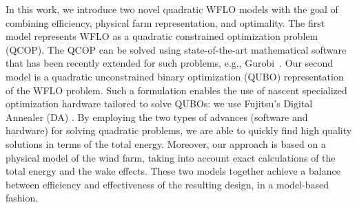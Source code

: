 \documentclass[preprint,12pt]{elsarticle}
\begin{document}

In this work, we introduce two novel quadratic WFLO models with the goal 
of combining efficiency, physical farm representation, and optimality. The first
model represents WFLO as a quadratic constrained optimization
problem (QCOP).  The QCOP can be solved using state-of-the-art mathematical software
that has been recently extended for such problems, e.g., Gurobi~\cite{gurobi}.  Our
second model is a quadratic unconstrained binary optimization
(QUBO) representation of the WFLO problem.  Such a formulation enables the use of
nascent specialized optimization hardware tailored to solve QUBOs: we use Fujitsu's Digital Annealer (DA) \cite{aramon2019physics}. By employing the two types of advances (software and hardware) for solving
quadratic problems, 
we are able to quickly find high quality solutions in terms of the total energy. Moreover, our approach is based
on a physical model of the wind farm, taking into account
exact calculations of the total energy and the wake effects. 
These two models together achieve a balance between efficiency and effectiveness of the resulting design, in a model-based fashion.
\end{document}

